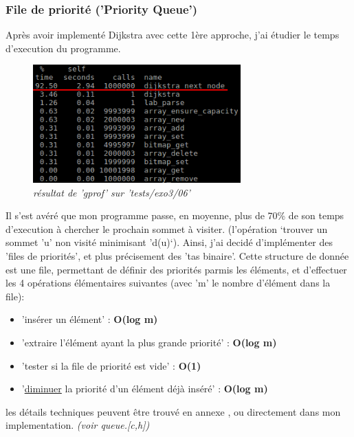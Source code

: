 \documentclass[a4paper,10pt]{article}
\begin{document}
    \subsubsection{File de priorité ('Priority Queue')}
      Après avoir implementé Dijkstra avec cette 1ère approche, j'ai étudier le temps d'execution du programme.\newline
     \begin{figure}
	\begin{center}
	  \includegraphics[width=8cm,height=\textheight,keepaspectratio]{./images/no_pqueue.png}
	\end{center}
	\caption{\textit{résultat de 'gprof' sur 'tests/exo3/06'}}
      \end{figure}
      Il s'est avéré que mon programme passe, en moyenne, plus de 70\% de son temps d'execution à chercher le prochain sommet à visiter.
      (l'opération `trouver un sommet 'u' non visité minimisant 'd(u)`).\newline\newline
      Ainsi, j'ai decidé d'implémenter des 'files de priorités', et plus précisement des 'tas binaire'.
      Cette structure de donnée est une file, permettant de définir des priorités parmis les éléments,
      et d'effectuer les 4 opérations élémentaires suivantes (avec 'm' le nombre d'élément dans la file):
      
      \begin{itemize}[label=-]
	\item 'insérer un élément' : \textbf{O(log m)}
	\item 'extraire l'élément ayant la plus grande priorité' : \textbf{O(log m)}
	\item 'tester si la file de priorité est vide' : \textbf{O(1)}
	\item '\underline{diminuer} la priorité d'un élément déjà inséré' : \textbf{O(log m)}
      \end{itemize}
      
      les détails techniques peuvent être trouvé en annexe \cite{binary_heap}, ou directement dans mon implementation. \textit{(voir queue.[c,h])}
\end{document}
